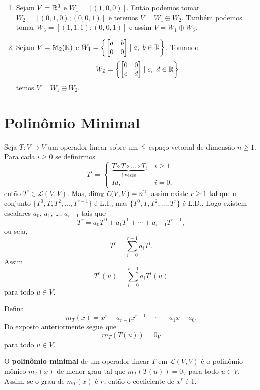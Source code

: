 \begin{exemplo}
	\begin{enumerate}[label={\arabic*})]
		\item Sejam $V = \mathbb{R}^3$ e $W_1 = [(1,0,0)]$. Ent\~ao podemos tomar $W_2 = [(0,1,0); (0,0,1)]$ e teremos $V = W_1 \oplus W_2$. Tamb\'em podemos tomar $W_3 = [(1,1,1); (0,0,1)]$ e assim $V = W_1
		\oplus W_3$.
		\item Sejam $V = \mathbb{M}_2(\mathbb{R})$ e $W_1 = \left\{\begin{bmatrix}
			a & b\\ 0 & 0
		\end{bmatrix} \mid a,\ b \in \mathbb{R}\right\}$. Tomando
		\[
			W_2 = \left\{\begin{bmatrix}
			0 & 0\\ c & d
		\end{bmatrix} \mid c,\ d \in \mathbb{R}\right\}
		\]
		temos $V = W_1 \oplus W_2$.
	\end{enumerate}
\end{exemplo}


\section{Polin\^omio Minimal} %
\label{sec:polinomio_minimal}

Seja $T : V \to V$ um operador linear sobre um $\mathbb{K}$-espa\c{c}o vetorial de dimens\~ao $n \ge 1$. Para cada $i \ge 0$ se definirmos
\[
	T^i = \begin{cases}
		\underbrace{T\circ T \circ \dots \circ T}_{i \mbox{ vezes}}, & i \ge 1\\
		Id, & i = 0,
	\end{cases}
\]
ent\~ao $T^i \in \mathcal{L}(V,V)$. Mas, $\dim_{\mathbb{K}} \mathcal{L}(V,V) = n^2$, assim existe $r \ge 1$ tal que o conjunto $\{T^0, T, T^2, \dots, T^{r - 1}\}$ \'e L.I., mas $\{T^0, T, T^2, \dots, T^r\}$ \'e L.D.. Logo existem escalares $a_0$, $a_1$, \dots, $a_{r - 1}$ tais que
\[
	T^r = a_0T^0 + a_1T^1 + \cdots + a_{r - 1}T^{r - 1},
\]
ou seja,
\[
	T^r = \sum_{i = 0}^{r - 1}a_iT^i.
\]
Assim
\[
	T^r(u) = \sum_{i = 0}^{r - 1}a_iT^i(u)
\]
para todo $u \in V$.

Defina
\[
	m_T(x) = x^r - a_{r - 1}x^{r - 1} - \cdots - a_1x - a_0.
\]
Do exposto anteriormente segue que
\[
	m_T(T(u)) = 0_V
\]
para todo $u \in V$.

\begin{definicao}
	O \textbf{polin\^omio minimal} de um operador linear $T$ em $\mathcal{L}(V,V)$ \'e o polin\^omio m\^onico $m_T(x)$ de menor grau tal que $m_T(T(u)) = 0_V$ para todo $u \in V$. Assim, se o grau de $m_T(x)$ \'e $r$, ent\~ao o coeficiente de $x^r$ \'e 1.
\end{definicao}


